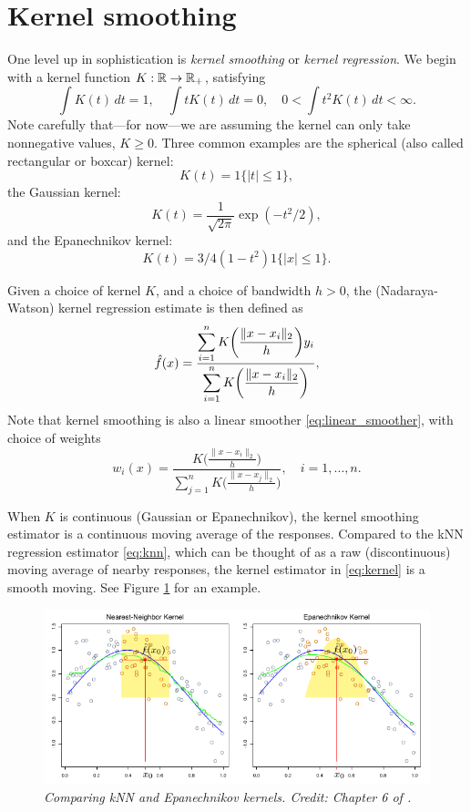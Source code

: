 \documentclass{article}
\begin{document}
\section{Kernel smoothing}

One level up in sophistication is \emph{kernel smoothing} or \emph{kernel 
  regression}. We begin with a kernel function $K : \mathbb{R} \to \mathbb{R}_+$, satisfying    
\[
\int K(t) \, dt = 1, \quad
\int t K(t) \, dt = 0, \quad
0 < \int t^2 K(t) \, dt < \infty.
\]
Note carefully that---for now---we are assuming the kernel can only take
nonnegative values, $K \geq 0$. Three common examples are the spherical (also
called rectangular or boxcar) kernel: 
\[
K(t) = 1\{|t| \leq 1\},
\]
the Gaussian kernel:
\[
K(t) = \frac{1}{\sqrt{2\pi}} \exp(-t^2/2),
\]
and the Epanechnikov kernel:
\[
K(t) = 3/4 (1-t^2) 1\{|x| \leq 1\}.
\]

Given a choice of kernel $K$, and a choice of bandwidth $h>0$, the
(Nadaraya-Watson) kernel regression estimate is then defined as
\begin{equation}
\label{eq:kernel}
\hat{f}(x) = 
\frac{\displaystyle \sum_{i=1}^n K\bigg( \frac{\|x-x_i\|_2}{h} \bigg)  y_i}  
{\displaystyle \sum_{i=1}^n K\bigg( \frac{\|x-x_i\|_2}{h} \bigg)}, 
\end{equation}
Note that kernel smoothing is also a linear smoother \eqref{eq:linear_smoother},
with choice of weights  
\[
w_i(x) = 
\frac{\displaystyle K\bigg ( \frac{\|x-x_i\|_2}{h} \bigg)}
{\displaystyle \sum_{j=1}^n K\bigg ( \frac{\|x-x_j\|_2}{h} \bigg)},
\quad i=1,\dots,n. 
\]

When $K$ is continuous (Gaussian or Epanechnikov), the kernel smoothing
estimator is a continuous moving average of the responses. Compared to the kNN
regression estimator \eqref{eq:knn}, which can be thought of as a raw 
(discontinuous) moving average of nearby responses, the kernel estimator in 
\eqref{eq:kernel} is a smooth moving. See Figure \ref{fig:kernel} for an example.

\begin{figure}[tb]
\centering
\includegraphics[width=\textwidth]{kernels.pdf}
\caption{\it Comparing kNN and Epanechnikov kernels. Credit: Chapter 6 of
  \citet{hastie2009elements}.}      
\label{fig:kernel}
\end{figure}
\end{document}
